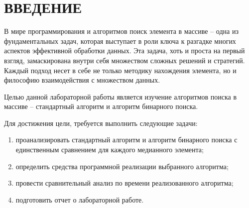 \chapter*{\hfill{\centering ВВЕДЕНИЕ}\hfill}

В мире программирования и алгоритмов поиск элемента в массиве -- одна из фундаментальных задач, которая выступает в роли ключа к разгадке многих аспектов эффективной обработки данных. 
Эта задача, хоть и проста на первый взгляд, замаскирована внутри себя множеством сложных решений и стратегий. 
Каждый подход несет в себе не только методику нахождения элемента, но и философию взаимодействия с множеством данных.

Целью данной лабораторной работы является изучение алгоритмов поиска в массиве -- стандартный алгоритм и алгоритм бинарного поиска.

Для достижения цели, требуется выполнить следующие задачи:

\begin{enumerate}[label={\arabic*)}]
	\item проанализировать стандартный алгоритм и алгоритм бинарного поиска с единственным сравнением для каждого медианного элемента;
	\item определить средства программной реализации выбранного алгоритма;
	\item провести сравнительный анализ по времени реализованного алгоритма;
	\item подготовить отчет о лабораторной работе.
\end{enumerate}